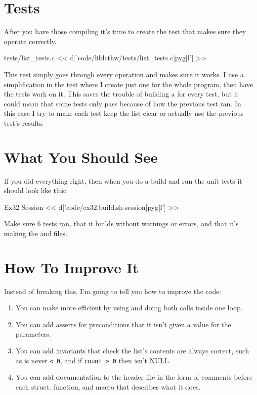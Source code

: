 \section{Tests}

After you have those compiling it's time to create the test that makes sure
they operate correctly.

\begin{code}{tests/list\_tests.c}
<< d['code/liblcthw/tests/list_tests.c|pyg|l'] >>
\end{code}

This test simply goes through every operation and makes sure it works.  I use
a simplification in the test where I create just one  for
the whole program, then have the tests work on it.  This saves the trouble
of building a  for every test, but it could mean that some tests
only pass because of how the previous test ran.  In this case I try to make
each test keep the list clear or actually use the previous test's results.

\section{What You Should See}

If you did everything right, then when you do a build and run the unit tests
it should look like this:

\begin{code}{Ex32 Session}
<< d['code/ex32.build.sh-session|pyg|l'] >>
\end{code}

Make sure 6 tests ran, that it builds without warnings or errors, and that it's
making the  and  files.

\section{How To Improve It}

Instead of breaking this, I'm going to tell you how to improve the code:

\begin{enumerate}
\item You can make  more efficient by using
     and doing both  calls inside one
    loop.
\item You can add asserts for preconditions that it isn't given a 
    value for the  parameters.
\item You can add invariants that check the list's contents are always correct,
    such as  is never \verb|< 0|, and if \verb|count > 0| then  isn't NULL.
\item You can add documentation to the header file in the form of comments before
    each struct, function, and macro that describes what it does.
\end{enumerate}

